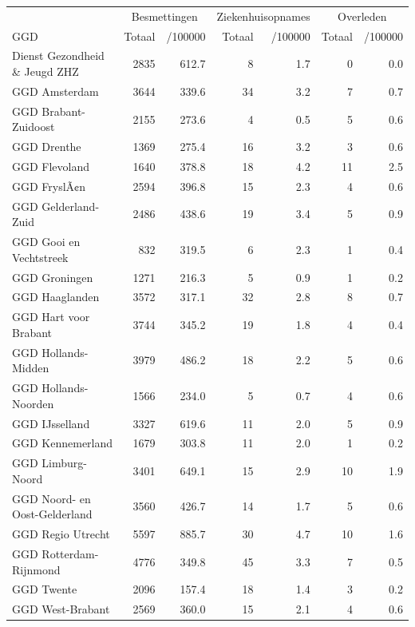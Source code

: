 \documentclass[
  english,
  man,floatsintext]{apa6}
\begin{document}
\begin{table}
\centering\begingroup\fontsize{10}{12}\selectfont

\begin{threeparttable}
\begin{tabular}{lrrrrrr}
\toprule
\multicolumn{1}{c}{ } & \multicolumn{2}{c}{Besmettingen} & \multicolumn{2}{c}{Ziekenhuisopnames} & \multicolumn{2}{c}{Overleden} \\
\cmidrule(l{3pt}r{3pt}){2-3} \cmidrule(l{3pt}r{3pt}){4-5} \cmidrule(l{3pt}r{3pt}){6-7}
GGD & Totaal & /100000 & Totaal & /100000 & Totaal & /100000\\
\midrule
Dienst Gezondheid \& Jeugd ZHZ & 2835 & 612.7 & 8 & 1.7 & 0 & 0.0\\
GGD Amsterdam & 3644 & 339.6 & 34 & 3.2 & 7 & 0.7\\
GGD Brabant-Zuidoost & 2155 & 273.6 & 4 & 0.5 & 5 & 0.6\\
GGD Drenthe & 1369 & 275.4 & 16 & 3.2 & 3 & 0.6\\
GGD Flevoland & 1640 & 378.8 & 18 & 4.2 & 11 & 2.5\\
GGD FryslÃ¢n & 2594 & 396.8 & 15 & 2.3 & 4 & 0.6\\
GGD Gelderland-Zuid & 2486 & 438.6 & 19 & 3.4 & 5 & 0.9\\
GGD Gooi en Vechtstreek & 832 & 319.5 & 6 & 2.3 & 1 & 0.4\\
GGD Groningen & 1271 & 216.3 & 5 & 0.9 & 1 & 0.2\\
GGD Haaglanden & 3572 & 317.1 & 32 & 2.8 & 8 & 0.7\\
GGD Hart voor Brabant & 3744 & 345.2 & 19 & 1.8 & 4 & 0.4\\
GGD Hollands-Midden & 3979 & 486.2 & 18 & 2.2 & 5 & 0.6\\
GGD Hollands-Noorden & 1566 & 234.0 & 5 & 0.7 & 4 & 0.6\\
GGD IJsselland & 3327 & 619.6 & 11 & 2.0 & 5 & 0.9\\
GGD Kennemerland & 1679 & 303.8 & 11 & 2.0 & 1 & 0.2\\
GGD Limburg-Noord & 3401 & 649.1 & 15 & 2.9 & 10 & 1.9\\
GGD Noord- en Oost-Gelderland & 3560 & 426.7 & 14 & 1.7 & 5 & 0.6\\
GGD Regio Utrecht & 5597 & 885.7 & 30 & 4.7 & 10 & 1.6\\
GGD Rotterdam-Rijnmond & 4776 & 349.8 & 45 & 3.3 & 7 & 0.5\\
GGD Twente & 2096 & 157.4 & 18 & 1.4 & 3 & 0.2\\
GGD West-Brabant & 2569 & 360.0 & 15 & 2.1 & 4 & 0.6\\

\end{tabular}
\end{threeparttable}
\end{table}
\end{document}
